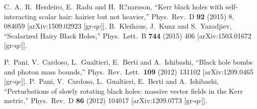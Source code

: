 \begin{small}
\begin{thebibliography}{99}
  C.~A.~R.~Herdeiro, E.~Radu and H.~R?narsson,
  ``Kerr black holes with self-interacting scalar hair: hairier but not heavier,''
  Phys.\ Rev.\ D {\bf 92} (2015) 8,  084059
  [arXiv:1509.02923 [gr-qc]].
  B.~Kleihaus, J.~Kunz and S.~Yazadjiev,
  ``Scalarized Hairy Black Holes,''
  Phys.\ Lett.\ B {\bf 744} (2015) 406
  [arXiv:1503.01672 [gr-qc]].

  P.~Pani, V.~Cardoso, L.~Gualtieri, E.~Berti and A.~Ishibashi,
  ``Black hole bombs and photon mass bounds,''
  Phys.\ Rev.\ Lett.\  {\bf 109} (2012) 131102
  [arXiv:1209.0465 [gr-qc]].
  P.~Pani, V.~Cardoso, L.~Gualtieri, E.~Berti and A.~Ishibashi,
  ``Perturbations of slowly rotating black holes: massive vector fields in the Kerr metric,''
  Phys.\ Rev.\ D {\bf 86} (2012) 104017
  [arXiv:1209.0773 [gr-qc]].


\end{thebibliography}
\end{small}
